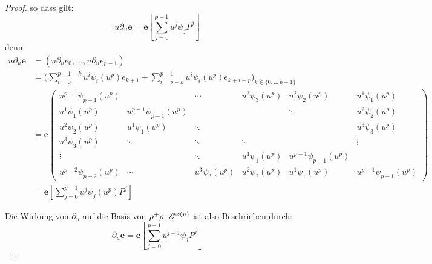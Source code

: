\begin{proof}
so dass gilt:
\[ u\partial_u\mathbf{e}=\mathbf{e}[\sum_{j=0}^{p-1}u^j\psi_jP^j] \]
denn:\\
\begin{align*}
  u\partial_u\mathbf{e} &= (u\partial_ue_0,...,u\partial_ue_{p-1})\\
  &= \Bigg(\sum_{i=0}^{p-1-k}u^i\psi_i(u^p)e_{k+1} +
    \sum_{i=p-k}^{p-1}u^i\psi_i(u^p)e_{k+i-p}\Bigg)_{k\in\{0,..,p-1\}}\\
  &= \mathbf{e}
  \begin{pmatrix}u^{p-1}\psi_{p-1}(u^p) &  & \cdots & u^{3}\psi_{3}(u^p) & u^{2}
    \psi_{2}(u^p) & u^{1}\psi_{1}(u^p)\\
    u^{1}\psi_{1}(u^p) & u^{p-1}\psi_{p-1}(u^p) &  &
    & \ddots & u^{2}\psi_{2}(u^p)\\
    u^{2}\psi_{2}(u^p) & u^{1}\psi_{1}(u^p) & \ddots &  &  & u^{3}\psi_{3}(u^p)\\
    u^{3}\psi_{3}(u^p) & \ddots & \ddots & \ddots &  & \vdots\\
    \vdots &  & \ddots & u^{1}\psi_{1}(u^p) & u^{p-1}\psi_{p-1}(u^p)\\
    u^{p-2}\psi_{p-2}(u^p) & \cdots & u^{3}\psi_{3}(u^p) & u^{2}\psi_{2}(u^p) &
    u^{1}\psi_{1}(u^p) & u^{p-1}\psi_{p-1}(u^p)
  \end{pmatrix}\\
  &= \mathbf{e}[\sum_{j=0}^{p-1}u^j\psi_j(u^p)P^j]
\end{align*}


Die Wirkung von $\partial_u$ auf die Basis von $\rho^+\rho_+\mathscr{E}^{\varphi(u)}$ ist
also Beschrieben durch:
\[ \partial_u\mathbf{e}=\mathbf{e}[\sum_{j=0}^{p-1}u^{j-1}\psi_jP^j] \]


\end{proof}
